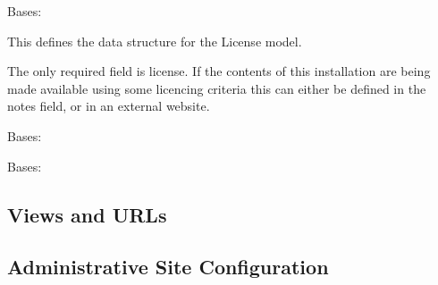 \documentclass[letterpaper,10pt,english]{sphinxmanual}
\begin{document}
\begin{fulllineitems}
\label{api:mousedb.groups.models.License}
Bases: 

This defines the data structure for the License model.

The only required field is license.
If the contents of this installation are being made available using some licencing criteria this can either be defined in the notes field, or in an external website.


\begin{fulllineitems}
\label{api:mousedb.groups.models.License.DoesNotExist}
Bases: 

\end{fulllineitems}



\begin{fulllineitems}
\label{api:mousedb.groups.models.License.MultipleObjectsReturned}
Bases: 

\end{fulllineitems}



\begin{fulllineitems}
\label{api:mousedb.groups.models.License.group_set}
\end{fulllineitems}


\end{fulllineitems}



\subsection{Views and URLs}
\label{api:id14}\label{api:module-mousedb.groups.views}

\subsection{Administrative Site Configuration}
\label{api:id15}\label{api:module-mousedb.groups.admin}
\end{document}
